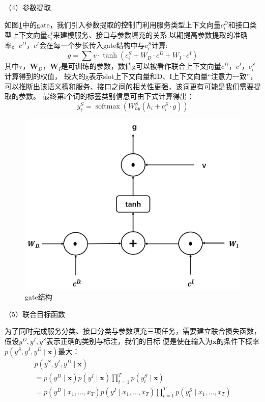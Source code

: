 （4）参数提取

如图\ref{fig:gate}中的gate，我们引入参数提取的控制门利用服务类型上下文向量${c}_{i}^{D}$和接口类型上下文向量${c}_{i}^{I}$来建模服务、接口与参数填充的关系
以期提高参数提取的准确率。${c}^{D}$，${c}^{I}$会在每一个步长传入gate结构中与${c}_{i}^{S}$计算:
\begin{equation}
    g=\sum v \cdot \tanh (c_{i}^{S}+W_D \cdot c^{D}+W_I \cdot c^{I})
  \end{equation}
其中v，$\mathbf{W}_D，\mathbf{W}_I$是可训练的参数，数值g可以被看作联合上下文向量${c}^{D}$，${c}^{I}$，${c}_{i}^{S}$计算得到的权值，
较大的g表示slot上下文向量和D、I上下文向量“注意力一致”，可以推断出该语义槽和服务、接口之间的相关性更强，该词更有可能是我们需要提取的参数。
最终第i个词的标签类别信息可由下式计算得出：
\begin{equation}
    y_{i}^{S}=\operatorname{softmax}\left(W_{h y}^{S}\left(h_{i}+c_{i}^{S} \cdot g\right)\right)
  \end{equation}

  \begin{figure}[htbp]
    \centering
    \includegraphics[scale=0.3]{./images/gate.jpg}
    \caption{gate结构}
    \label{fig:gate}
  \end{figure}

（5）联合目标函数

为了同时完成服务分类、接口分类与参数填充三项任务，需要建立联合损失函数，假设$y^D,y^I,y^S$表示正确的类别与标注，我们的目标
便是使在输入为$\mathbf{x}$的条件下概率$p\left(y^{S}, y^{I},y^{D} \mid \mathbf{x}\right)$最大：
\begin{equation}
    \begin{array}{l}
        p\left(y^{S}, y^{I},y^{D} \mid \mathbf{x}\right) \\
        =p\left(y^{D} \mid \mathbf{x}\right) p\left(y^{I} \mid \mathbf{x}\right) \prod_{t=1}^{T} p\left(y_{t}^{S} \mid \mathbf{x}\right) \\
        =p(y^{D} \mid x_{1}, \ldots, x_{T}) p(y^{I} \mid x_{1}, \ldots, x_{T}) \prod_{t=1}^{T} p(y_{t}^{S} \mid x_{1}, \ldots, x_{T})
        \end{array}
    \end{equation}


